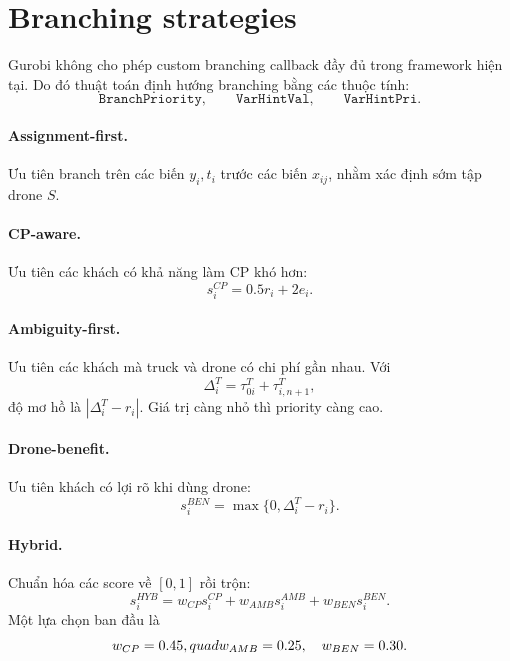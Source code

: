 \documentclass[12pt,a4paper]{article}
\begin{document}
\section{Branching strategies}
\label{sec:branching}

Gurobi không cho phép custom branching callback đầy đủ trong framework hiện tại. Do đó thuật toán định hướng branching bằng các thuộc tính:
\[
    \texttt{BranchPriority},\qquad \texttt{VarHintVal},\qquad \texttt{VarHintPri}.
\]

\paragraph{Assignment-first.}
Ưu tiên branch trên các biến $y_i,t_i$ trước các biến $x_{ij}$, nhằm xác định sớm tập drone $S$.

\paragraph{CP-aware.}
Ưu tiên các khách có khả năng làm CP khó hơn:
\begin{equation}
    s_i^{CP}=0.5r_i+2e_i.
    \label{eq:cp-aware}
\end{equation}

\paragraph{Ambiguity-first.}
Ưu tiên các khách mà truck và drone có chi phí gần nhau. Với
\[
    \Delta_i^T=\tau^T_{0i}+\tau^T_{i,n+1},
\]
độ mơ hồ là $|\Delta_i^T-r_i|$. Giá trị càng nhỏ thì priority càng cao.

\paragraph{Drone-benefit.}
Ưu tiên khách có lợi rõ khi dùng drone:
\begin{equation}
    s_i^{BEN}=\max\{0,\Delta_i^T-r_i\}.
    \label{eq:drone-benefit}
\end{equation}

\paragraph{Hybrid.}
Chuẩn hóa các score về $[0,1]$ rồi trộn:
\begin{equation}
    s_i^{HYB}=w_{CP}s_i^{CP}+w_{AMB}s_i^{AMB}+w_{BEN}s_i^{BEN}.
    \label{eq:hybrid}
\end{equation}
Một lựa chọn ban đầu là
\[
    w_{CP}=0.45,\\quad w_{AMB}=0.25,\quad w_{BEN}=0.30.
\]
\end{document}
